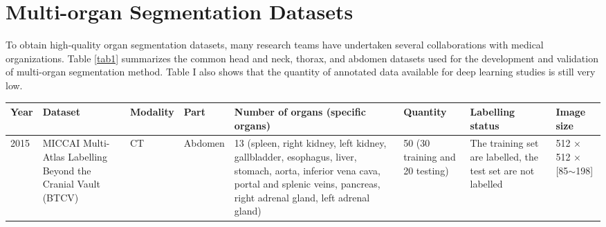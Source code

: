 \documentclass[lettersize,journal]{IEEEtran}
\begin{document}
\section{Multi-organ Segmentation Datasets}
\label{sec3}
To obtain high-quality organ segmentation datasets, many research teams have undertaken several collaborations with medical organizations. Table \ref{tab1} summarizes the common head and neck, thorax, and abdomen datasets used for the development and validation of multi-organ segmentation method. Table I also shows that the quantity of annotated data available for deep learning studies is still very low.
\begin{table*}[ht!]
\centering 
\caption{Frequently Used Dataset for Multi-organ Segmentation}
\label{tab1}
\begin{tabular}{@{}lm{}llm{}m{}m{}l@{}}
\toprule
Year                  & Dataset                                                                                                                                          & Modality            & Part                     & Number of organs (specific organs)                                                                                                                                                                                                                                                                                                                                                      & Quantity                                                                 & Labelling status                                              & Image size                                     \\ \midrule
2015                  & MICCAI Multi-Atlas Labelling Beyond the Cranial Vault (BTCV) \cite{29}                                                                            & CT                  & Abdomen                  & 13 (spleen, right kidney, left kidney, gallbladder, esophagus, liver, stomach, aorta, inferior vena cava, portal and splenic veins, pancreas, right adrenal gland, left adrenal gland)                                                                                                                                                                                                  & 50 (30 training and 20 testing)                                          & The training set are labelled, the test set are not labelled  & 512 × 512 × {[}85$\sim$198{]}                  \\

\end{tabular}
\end{table*}
\end{document}
